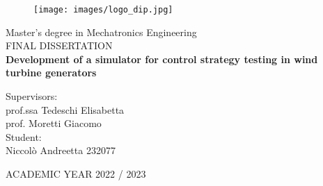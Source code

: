 \begin{figure}[H]
    \texttt{[image: images/logo\_dip.jpg]}
\end{figure}
\vspace{1.75cm}
\begin{center}
\huge
    Master's degree in Mechatronics Engineering\\ 
    \vspace{0.5 cm}
    FINAL DISSERTATION\\ 
    \vspace{1 cm}
    \textbf{Development of a simulator for control strategy testing in wind turbine generators}

\vspace{1.5 cm}

\end{center}
{\Large
Supervisors: \\
prof.ssa Tedeschi Elisabetta\\ 
prof. Moretti Giacomo\\
Student:\\
Niccolò Andreetta 232077 \\ 

\vspace{0.5 cm}

\begin{center}
	ACADEMIC YEAR 2022 / 2023
\end{center}
\thispagestyle{empty}
\newpage
}

% 
\newpage
\tableofcontents

\newpage
{} %
\printglossary[type=\acronymtype]
